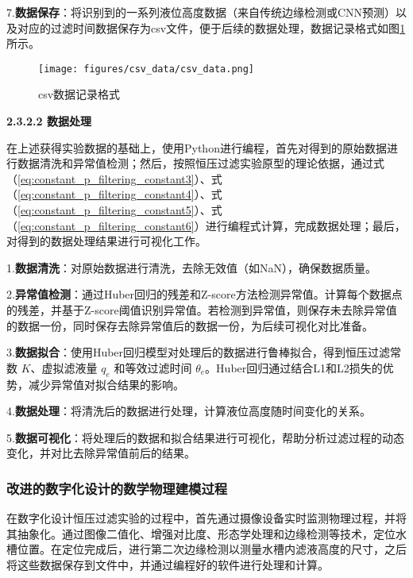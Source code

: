 \documentclass[UTF8,a4paper,fontset=none]{ctexart}
\newcommand{\wuhao}{\fontsize{10.5pt}{15pt}\selectfont}       %
\begin{document}
7.\textbf{数据保存}：将识别到的一系列液位高度数据（来自传统边缘检测或CNN预测）以及对应的过滤时间数据保存为csv文件，便于后续的数据处理，数据记录格式如图\ref{fig:csv_data}所示。

\begin{figure}[H]
    \centering
    \texttt{[image: figures/csv\_data/csv\_data.png]}
    \caption{csv数据记录格式}
    \label{fig:csv_data}
\end{figure}

{\noindent \wuhao \rmfamily {} \textbf{2.3.2.2 \quad 数据处理}}


在上述获得实验数据的基础上，使用Python进行编程，首先对得到的原始数据进行数据清洗和异常值检测；然后，按照恒压过滤实验原型的理论依据，通过式（\ref{eq:constant_p_filtering_constant3}）、式（\ref{eq:constant_p_filtering_constant4}）、式（\ref{eq:constant_p_filtering_constant5}）、式（\ref{eq:constant_p_filtering_constant6}）进行编程式计算，完成数据处理；最后，对得到的数据处理结果进行可视化工作。

1.\textbf{数据清洗}：对原始数据进行清洗，去除无效值（如NaN），确保数据质量。

2.\textbf{异常值检测}：通过Huber回归的残差和Z-score方法检测异常值。计算每个数据点的残差，并基于Z-score阈值识别异常值。若检测到异常值，则保存未去除异常值的数据一份，同时保存去除异常值后的数据一份，为后续可视化对比准备。

3.\textbf{数据拟合}：使用Huber回归模型对处理后的数据进行鲁棒拟合，得到恒压过滤常数 \(K\)、虚拟滤液量 \(q_e\) 和等效过滤时间 \(\theta_e\)。Huber回归通过结合L1和L2损失的优势，减少异常值对拟合结果的影响。

4.\textbf{数据处理}：将清洗后的数据进行处理，计算液位高度随时间变化的关系。

5.\textbf{数据可视化}：将处理后的数据和拟合结果进行可视化，帮助分析过滤过程的动态变化，并对比去除异常值前后的结果。

\subsubsection{改进的数字化设计的数学物理建模过程}

在数字化设计恒压过滤实验的过程中，首先通过摄像设备实时监测物理过程，并将其抽象化。通过图像二值化、增强对比度、形态学处理和边缘检测等技术，定位水槽位置。在定位完成后，进行第二次边缘检测以测量水槽内滤液高度的尺寸，之后将这些数据保存到文件中，并通过编程好的软件进行处理和计算。
\end{document}
